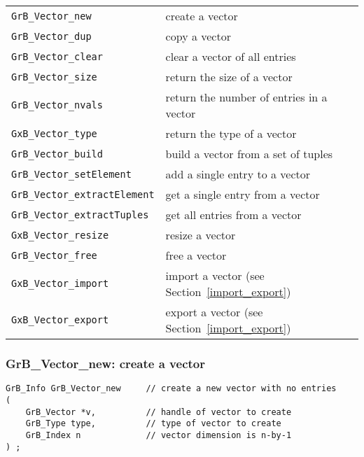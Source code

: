 \documentclass[12pt]{article}
\begin{document}
\vspace{0.2in}
{\footnotesize
\begin{tabular}{ll}
\hline
\verb'GrB_Vector_new'            & create a vector \\
\verb'GrB_Vector_dup'            & copy a vector \\
\verb'GrB_Vector_clear'          & clear a vector of all entries \\
\verb'GrB_Vector_size'           & return the size of a vector \\
\verb'GrB_Vector_nvals'          & return the number of entries in a vector \\
\verb'GxB_Vector_type'           & return the type of a vector \\
\verb'GrB_Vector_build'          & build a vector from a set of tuples \\
\verb'GrB_Vector_setElement'     & add a single entry to a vector \\
\verb'GrB_Vector_extractElement' & get a single entry from a vector \\
\verb'GrB_Vector_extractTuples'  & get all entries from a vector \\
\verb'GxB_Vector_resize'         & resize a vector \\
\verb'GrB_Vector_free'           & free a vector \\
\hline
\verb'GxB_Vector_import'         & import a vector
                                    (see Section~\ref{import_export})\\
\verb'GxB_Vector_export'         & export a vector
                                    (see Section~\ref{import_export})\\
\hline
\end{tabular}
}


\newpage
\subsubsection{{\sf GrB\_Vector\_new:}           create a vector}
\label{vector_new}

\begin{mdframed}[userdefinedwidth=6in]
{\footnotesize
\begin{verbatim}
GrB_Info GrB_Vector_new     // create a new vector with no entries
(
    GrB_Vector *v,          // handle of vector to create
    GrB_Type type,          // type of vector to create
    GrB_Index n             // vector dimension is n-by-1
) ;
\end{verbatim}
} \end{mdframed}
\end{document}
